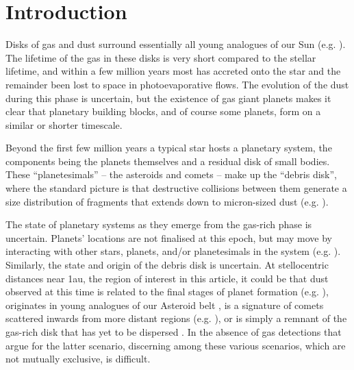 \documentclass[]{rsos}
\begin{document}
\maketitle

\section{Introduction}\label{s:intro}

Disks of gas and dust surround essentially all young analogues of our Sun
(e.g. \cite{2001ApJ...553L.153H}). The lifetime of the gas in these disks is very short
compared to the stellar lifetime, and within a few million years most has accreted onto
the star and the remainder been lost to space in photoevaporative flows. The evolution of
the dust during this phase is uncertain, but the existence of gas giant planets makes it
clear that planetary building blocks, and of course some planets, form on a similar or
shorter timescale.

Beyond the first few million years a typical star hosts a planetary system, the
components being the planets themselves and a residual disk of small bodies. These
``planetesimals'' -- the asteroids and comets -- make up the ``debris disk'', where the
standard picture is that destructive collisions between them generate a size distribution
of fragments that extends down to micron-sized dust
(e.g. \cite{1993prpl.conf.1253B,2002MNRAS.334..589W,2010RAA....10..383K}).

The state of planetary systems as they emerge from the gas-rich phase is
uncertain. Planets' locations are not finalised at this epoch, but may move by
interacting with other stars, planets, and/or planetesimals in the system
(e.g. \cite{2007ApJ...669.1298F,1996Sci...274..954R,2005Natur.435..459T}). Similarly, the
state and origin of the debris disk is uncertain. At stellocentric distances near 1au,
the region of interest in this article, it could be that dust observed at this time is
related to the final stages of planet formation
(e.g. \cite{2010ApJ...717L..57M,2012MNRAS.425..657J}), originates in young analogues of
our Asteroid belt \cite{2013MNRAS.433.2334K}, is a signature of comets scattered inwards
from more distant regions (e.g. \cite{2009MNRAS.399..385B}), or is simply a remnant of
the gas-rich disk that has yet to be dispersed \cite{2014MNRAS.438.3299K}. In the absence
of gas detections that argue for the latter scenario, discerning among these various
scenarios, which are not mutually exclusive, is difficult.
\end{document}
